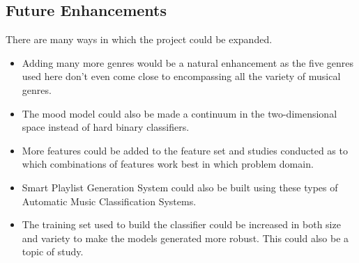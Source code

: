 \subsection{Future Enhancements}
There are many ways in which the project could be expanded. 
\begin{itemize}
        \item Adding many more genres would be a natural enhancement as the five genres used here don’t even come close to encompassing all the variety of musical genres. 
        \item The mood model could also be made a continuum in the two-dimensional space instead of hard binary classifiers. 
        \item More features could be added to the feature set and studies conducted as to which combinations of features work best in which problem domain. 
        \item Smart Playlist Generation System could also be built using these types of Automatic Music Classification Systems. 
        \item The training set used to build the classifier could be increased in both size and variety to make the models generated more robust. This could also be a topic of study.
\end{itemize}






